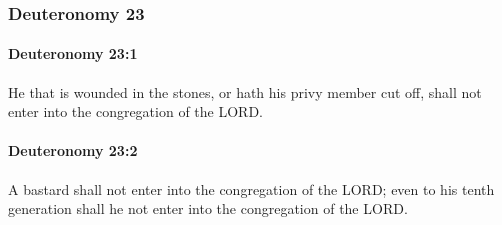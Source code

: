 	\subsubsection{Deuteronomy 23} %
		\label{DEUTERONOMY-23}

		\paragraph{Deuteronomy 23:1} %
			\label{DEUTERONOMY-23-1}

			He that is wounded in the stones, or hath his privy member cut off, shall not enter into the congregation of the LORD.


		\paragraph{Deuteronomy 23:2} %
			\label{DEUTERONOMY-23-2}

			A bastard shall not enter into the congregation of the LORD; even to his tenth generation shall he not enter into the congregation of the LORD.

